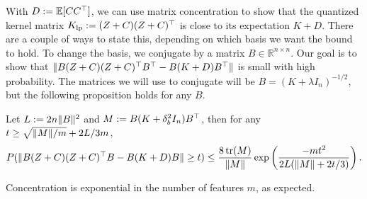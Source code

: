 With $D := \mathbb{E}[C C^\top]$, we can use matrix concentration to show that the
quantized kernel matrix $K_\mathrm{lp} := (Z + C)(Z + C)^\top$ is close to its
expectation $K + D$.
There are a couple of ways to state this, depending on which basis we want the
bound to hold.
To change the basis, we conjugate by a matrix $B \in \mathbb{R}^{n \times n}$.
Our goal is to show that $\|B (Z + C)(Z + C)^\top B^\top - B(K + D)B^\top\|$ is small
with high probability.
The matrices we will use to conjugate will be $B = (K + \lambda I_n)^{-1/2}$, but the
following proposition holds for any $B$.

\begin{proposition}
  Let $L := 2n \|B\|^2$ and $M := B(K + \delta^2_b I_n) B^\top$,
  then for any $t \geq \sqrt{\|M\| / m} + 2L/3m$,
  \begin{equation*}
    P(\|B(Z + C)(Z + C)^\top B - B(K + D)B\| \geq t) \leq \frac{8\mathop{\rm tr}(M)}{\|M\|}
    \exp \left( \frac{-mt^2}{2L(\|M\| + 2t/3)} \right).
  \end{equation*}
  \label{prop:quantized_concentration}
\end{proposition}
Concentration is exponential in the number of features $m$, as expected.


